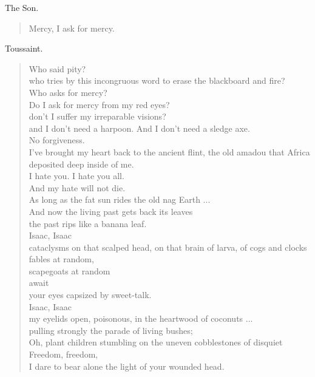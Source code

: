 \documentclass[letterpaper,article,12pt,oneside,notitlepage]{memoir}
\begin{document}
\begin{center}The Son.\end{center}

\begin{verse}
Mercy, I ask for mercy. \\
\end{verse}

\begin{center}Toussaint.\end{center}

\begin{verse}
Who said pity? \\
who tries by this incongruous word to erase the blackboard and fire? \\
Who asks for mercy? \\
Do I ask for mercy from my red eyes? \\
don't I suffer my irreparable visions? \\
and I don't need a harpoon. And I don't need a sledge axe. \\
No forgiveness. \\
I've brought my heart back to the ancient flint, the old amadou that Africa deposited deep inside of me.  \\
I hate you. I hate you all. \\
And my hate will not die. \\
As long as the fat sun rides the old nag Earth ... \\
And now the living past gets back its leaves \\
the past rips like a banana leaf. \\
Isaac, Isaac \\
cataclysms on that scalped head, on that brain of larva, of cogs and clocks  \\
fables at random, \\
scapegoats at random \\
await \\
your eyes capsized by sweet-talk. \\
Isaac, Isaac \\
my eyelids open, poisonous, in the heartwood of coconuts ... \\
pulling strongly the parade of living bushes; \\
Oh, plant children stumbling on the uneven cobblestones of disquiet \\
Freedom, freedom, \\
I dare to bear alone the light of your wounded head. \\
\end{verse}
\end{document}
